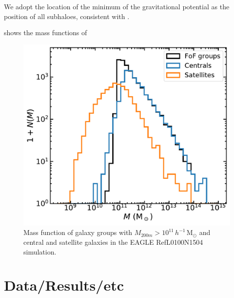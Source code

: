 \documentclass[usenatbib,fleqn]{mnras}
\newcommand{\Msun}{\mathrm{M}_\odot}
\newcommand{\hMsun}{h^{-1}\,\Msun}
\begin{document}
We adopt the location of the minimum of the gravitational potential as the position of all subhaloes, consistent with \cite{velliscig17}.

 shows the mass functions of 

\begin{figure}
  \centerline{\includegraphics[width=\linewidth]{massfunction.pdf}}
\caption{Mass function of galaxy groups with $M_{200m}>10^{11}\,\hMsun$ and central and satellite galaxies in the EAGLE RefL0100N1504 simulation.}
\label{f:massfunction}
\end{figure}


\section{Data/Results/etc}
\end{document}
